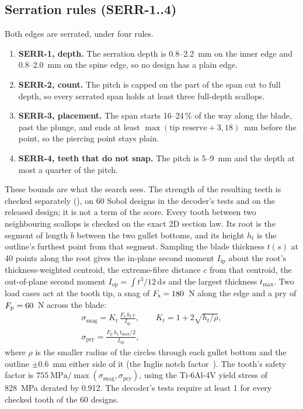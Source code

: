 \subsection{Serration rules (SERR-1..4)}
Both edges are serrated, under four rules.
\begin{enumerate}
\item \textbf{SERR-1, depth.} The serration depth is 0.8--2.2~mm on the inner edge and 0.8--2.0~mm on the spine edge,
so no design has a plain edge.
\item \textbf{SERR-2, count.} The pitch is capped on the part of the span cut to full depth, so every serrated span
holds at least three full-depth scallops.
\item \textbf{SERR-3, placement.} The span starts 16--24\,\% of the way along the blade, past the plunge, and ends at
least $\max(\text{tip reserve} + 3, 18)$~mm before the point, so the piercing point stays plain.
\item \textbf{SERR-4, teeth that do not snap.} The pitch is 5--9~mm and the depth at most a quarter of the pitch.
\end{enumerate}
These bounds are what the search sees. The strength of the resulting teeth is checked separately
(), on 60 Sobol designs in the decoder's tests and on the
released design; it is not a term of the score. Every tooth between two neighbouring scallops is checked on the exact
2D section law. Its root is the segment of length $b$ between the two gullet bottoms, and its height $h_t$ is the
outline's furthest point from that segment. Sampling the blade thickness $t(s)$ at 40 points along the root gives the
in-plane second moment $I_\mathrm{ip}$ about the root's thickness-weighted centroid, the extreme-fibre distance $c$ from
that centroid, the out-of-plane second moment $I_\mathrm{op} = \int t^3/12\,\mathrm{d}s$ and the largest thickness
$t_\mathrm{max}$. Two load cases act at the tooth tip, a snag of $F_\mathrm{s} = 180$~N along the edge and a pry of
$F_\mathrm{p} = 60$~N across the blade:
\begin{gather}
\sigma_\mathrm{snag} = K_t\,\frac{F_\mathrm{s}\, h_t\, c}{I_\mathrm{ip}}, \qquad K_t = 1 + 2\sqrt{h_t/\rho}, \\
\sigma_\mathrm{pry} = \frac{F_\mathrm{p}\, h_t\, t_\mathrm{max}/2}{I_\mathrm{op}},
\end{gather}
where $\rho$ is the smaller radius of the circles through each gullet bottom and the outline $\pm0.6$~mm either side
of it (the Inglis notch factor~\cite{inglis1913}). The tooth's safety factor is
$755~\mathrm{MPa}/\max(\sigma_\mathrm{snag}, \sigma_\mathrm{pry})$, using the Ti-6Al-4V yield stress of 828~MPa derated
by 0.912. The decoder's tests require at least 1 for every checked tooth of the 60 designs.
